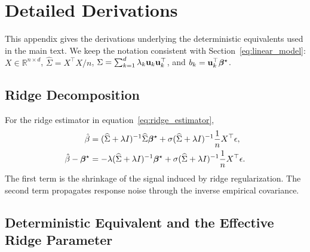 \section{Detailed Derivations}
\label{app:derivations}

This appendix gives the derivations underlying the deterministic equivalents used in the main text. We keep the notation consistent with Section~\ref{eq:linear_model}: $X\in\mathbb{R}^{n\times d}$, $\widehat{\Sigma}=X^\top X/n$, $\Sigma=\sum_{k=1}^d\lambda_k \mathbf{u}_k\mathbf{u}_k^\top$, and $b_k=\mathbf{u}_k^\top\boldsymbol{\beta}^{\star}$.

\subsection{Ridge Decomposition}

For the ridge estimator in equation~\eqref{eq:ridge_estimator},
\begin{align}
    \hat{\beta}
    &= (\widehat{\Sigma}+\lambda I)^{-1}\widehat{\Sigma}\boldsymbol{\beta}^{\star}
    + \sigma(\widehat{\Sigma}+\lambda I)^{-1}\frac{1}{n}X^\top\epsilon ,
    \label{eq:app_bhat_decomp}\\
    \hat{\beta}-\boldsymbol{\beta}^{\star}
    &= -\lambda(\widehat{\Sigma}+\lambda I)^{-1}\boldsymbol{\beta}^{\star}
    + \sigma(\widehat{\Sigma}+\lambda I)^{-1}\frac{1}{n}X^\top\epsilon .
    \label{eq:app_delta_beta}
\end{align}
The first term is the shrinkage of the signal induced by ridge regularization. The second term propagates response noise through the inverse empirical covariance.

\subsection{Deterministic Equivalent and the Effective Ridge Parameter}

